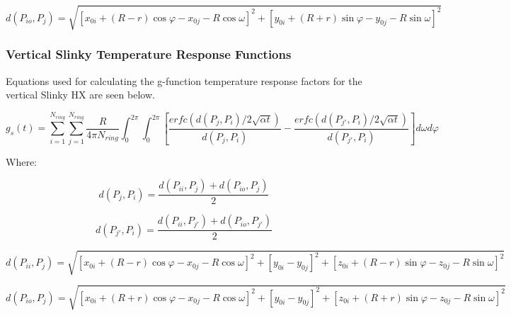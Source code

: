 \begin{equation}
d\left(P_{io},P_j\right) = \sqrt{\left[x_{0i} + \left(R-r\right)\cos \varphi - x_{0j}-R\cos \omega\right]^2 + \left[y_{0i} + \left(R+r\right)\sin \varphi - y_{0j}-R\sin \omega\right]^2}
\end{equation}

\subsubsection{Vertical Slinky Temperature Response Functions}\label{vertical-slinky-temperature-response-functions}

Equations used for calculating the g-function temperature response factors for the vertical Slinky HX are seen below.

\begin{equation}
g_s\left(t\right) = \sum_{i = 1}^{N_{ring}} \sum_{j = 1}^{N_{ring}} \frac{R}{4\pi N_{ring}} \int_0^{2\pi} \int_0^{2\pi} 
            \left[ 
                \frac{erfc\left(d\left(P_j,P_i\right)/2\sqrt{\alpha t}\right)}{d\left(P_j,P_i\right)} - 
                \frac{erfc\left(d\left(P_{j'},P_i\right)/2\sqrt{\alpha t}\right)}{d\left(P_{j'},P_i\right)}
            \right]d\omega d\varphi
\end{equation}

Where:

\begin{equation}
d\left(P_j,P_i\right) = \frac{d\left(P_{ii},P_j\right) + d\left(P_{io},P_j\right)}{2}
\end{equation}

\begin{equation}
d\left(P_{j'},P_i\right) = \frac{d\left(P_{ii},P_{j'}\right) + d\left(P_{io},P_{j'}\right)}{2}
\end{equation}

{\scriptsize
\begin{equation}
d\left(P_{ii},P_j\right) = \sqrt{\left[x_{0i} + \left(R-r\right)\cos \varphi - x_{0j}-R\cos \omega\right]^2 + \left[y_{0i}-y_{0j}\right]^2 + \left[z_{0i} + \left(R-r\right)\sin \varphi - z_{0j}-R\sin \omega\right]^2}
\end{equation}}

{\scriptsize
\begin{equation}
d\left(P_{io},P_j\right) = \sqrt{\left[x_{0i} + \left(R+r\right)\cos \varphi - x_{0j}-R\cos \omega\right]^2 + \left[y_{0i}-y_{0j}\right]^2 + \left[z_{0i} + \left(R+r\right)\sin \varphi - z_{0j}-R\sin \omega\right]^2}
\end{equation}}

